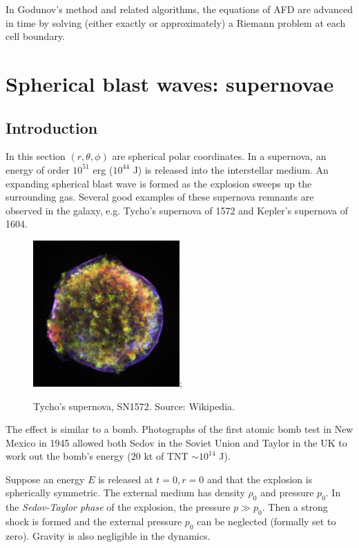 \documentclass{jknotes}
\begin{document}
In Godunov's method and related algorithms, the equations of AFD are advanced
in time by solving (either exactly or approximately) a Riemann problem at each
cell boundary.

\section{Spherical blast waves: supernovae}
\subsection{Introduction}
In this section $(r, \theta, \phi)$ are spherical polar coordinates. In a
supernova, an energy of order $10^{51}$ erg ($10^{44}$ J) is released into the
interstellar medium. An expanding spherical blast wave is formed as the
explosion sweeps up the surrounding gas. Several good examples of these
supernova remnants are observed in the galaxy, e.g. Tycho's supernova of 1572
and Kepler's supernova of 1604.

\begin{figure}
	\centering
	\includegraphics[width=0.5\textwidth]{sn1572.jpg};
	\caption{Tycho's supernova, SN1572. Source: Wikipedia.}
\end{figure}

The effect is similar to a bomb. Photographs of the first atomic bomb test in
New Mexico in 1945 allowed both Sedov in the Soviet Union and Taylor in the UK
to work out the bomb's energy ($20$ kt of TNT $\sim 10^{14}$ J). 

Suppose an energy $E$ is released at $t=0, r=0$ and that the explosion is
spherically symmetric. The external medium has density $\rho_0$ and pressure
$p_0$. In the \emph{Sedov-Taylor phase} of the explosion, the pressure $p \gg
p_0$. Then a strong shock is formed and the external pressure $p_0$ can be
neglected (formally set to zero). Gravity is also negligible in the dynamics.
\end{document}
